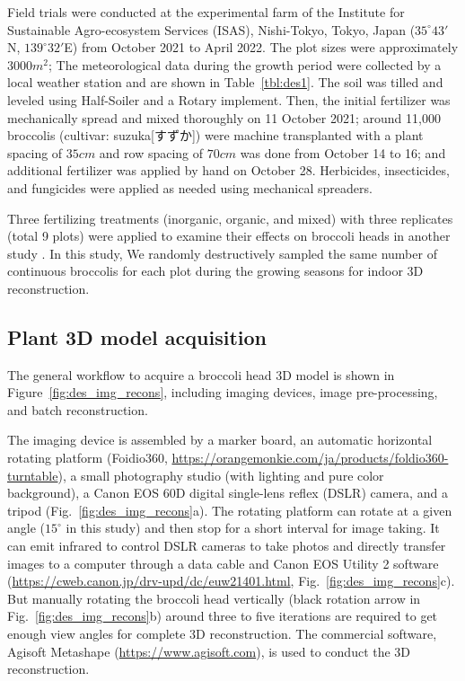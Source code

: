 Field trials were conducted at the experimental farm of the Institute for Sustainable Agro-ecosystem Services (ISAS), Nishi-Tokyo, Tokyo, Japan ($35^\circ 43'$N, $139^\circ 32'$E) from October 2021 to April 2022. The plot sizes were approximately $3000 m^2$; The meteorological data during the growth period were collected by a local weather station and are shown in Table~\ref{tbl:des1}. The soil was tilled and leveled using Half-Soiler and a Rotary implement. Then, the initial fertilizer was mechanically spread and mixed thoroughly on 11 October 2021; around 11,000 broccolis (cultivar: suzuka[すずか]) were machine transplanted with a plant spacing of $35 cm$ and row spacing of $70 cm$ was done from October 14 to 16; and additional fertilizer was applied by hand on October 28. Herbicides, insecticides, and fungicides were applied as needed using mechanical spreaders.



Three fertilizing treatments (inorganic, organic, and mixed) with three replicates (total 9 plots) were applied to examine their effects on broccoli heads in another study \citep{nishida_estimation_2023}. In this study, We randomly destructively sampled the same number of continuous broccolis for each plot during the growing seasons for indoor 3D reconstruction. 

\subsection{Plant 3D model acquisition}

The general workflow to acquire a broccoli head 3D model is shown in Figure~\ref{fig:des_img_recons}, including imaging devices, image pre-processing, and batch reconstruction.



The imaging device is assembled by a marker board, an automatic horizontal rotating platform (Foidio360, \url{https://orangemonkie.com/ja/products/foldio360-turntable}), a small photography studio (with lighting and pure color background), a Canon EOS 60D digital single-lens reflex (DSLR) camera, and a tripod (Fig.~\ref{fig:des_img_recons}a). The rotating platform can rotate at a given angle ($15^\circ$ in this study) and then stop for a short interval for image taking. It can emit infrared to control DSLR cameras to take photos and directly transfer images to a computer through a data cable and Canon EOS Utility 2 software (\url{https://cweb.canon.jp/drv-upd/dc/euw21401.html}, Fig.~\ref{fig:des_img_recons}c). But manually rotating the broccoli head vertically (black rotation arrow in Fig.~\ref{fig:des_img_recons}b) around three to five iterations are required to get enough view angles for complete 3D reconstruction. The commercial software, Agisoft Metashape (\url{https://www.agisoft.com}), is used to conduct the 3D reconstruction.

